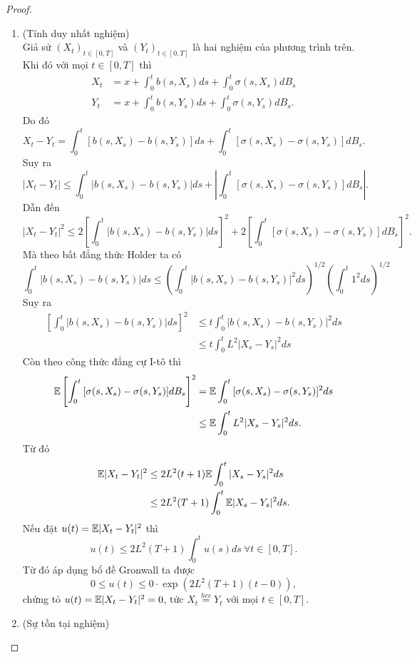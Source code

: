 \begin{proof}
\begin{enumerate}
    \item (Tính duy nhất nghiệm)\\
    Giả sử $(X_t)_{t \in [0,T]}$ và $(Y_t)_{t \in [0,T]}$ là hai nghiệm của phương trình trên. Khi đó với mọi $t \in [0,T]$ thì
    \begin{align*}
        X_t &= x + \int_0^t{b(s,X_s)ds} + \int_0^t{\sigma(s,X_s)dB_s}\\
        Y_t &= x + \int_0^t{b(s,Y_s)ds} + \int_0^t{\sigma(s,Y_s)dB_s}.
    \end{align*}
    Do đó 
    \[X_t-Y_t = \int_0^t{[b(s,X_s)-b(s,Y_s)]ds} + \int_0^t{[\sigma(s,X_s)-\sigma(s,Y_s)]dB_s}.\]
    Suy ra 
    \[|X_t-Y_t| \leq \int_0^t{\left|b(s,X_s)-b(s,Y_s)\right|ds} + \left|\int_0^t{[\sigma(s,X_s)-\sigma(s,Y_s)]dB_s}\right|.\]
    Dẫn đến 
    \[|X_t-Y_t|^2 \leq 2\left[\int_0^t{\left|b(s,X_s)-b(s,Y_s)\right|ds}\right]^2 + 2\left[\int_0^t{[\sigma(s,X_s)-\sigma(s,Y_s)]dB_s}\right]^2.\]
    Mà theo bất đẳng thức Holder ta có
    \[\int_0^t{\left|b(s,X_s)-b(s,Y_s)\right|ds} \leq \left(\int_0^t{\left|b(s,X_s)-b(s,Y_s)\right|^2ds}\right)^{1/2} \left(\int_0^t{1^2ds}\right)^{1/2}\]
    Suy ra 
    \begin{align*}
        \left[\int_0^t{\left|b(s,X_s)-b(s,Y_s)\right|ds}\right]^2 
        &\leq t\int_0^t{\left|b(s,X_s)-b(s,Y_s)\right|^2ds}\\
        &\leq t\int_0^t{L^2\left|X_s-Y_s\right|^2ds}
    \end{align*}
    Còn theo công thức đẳng cự I-tô thì
    \begin{align*}
        \mathbb{E}\left[\int_0^t{[\sigma(s,X_s)-\sigma(s,Y_s)]dB_s}\right]^2 
        &= \mathbb{E}\int_0^t{[\sigma(s,X_s)-\sigma(s,Y_s)]^2ds}\\
        & \leq \mathbb{E}\int_0^t{L^2|X_s-Y_s|^2ds}.
    \end{align*}
    Từ đó
    \begin{align*}
        \mathbb{E}|X_t-Y_t|^2 &\leq 2L^2(t+1)\mathbb{E}\int_0^t{|X_s-Y_s|^2ds}\\
        & \leq 2L^2(T+1)\int_0^t{\mathbb{E}|X_s-Y_s|^2ds}.
    \end{align*}
    Nếu đặt $u(t) = \mathbb{E}|X_t-Y_t|^2$ thì
    \[u(t) \leq 2L^2(T+1)\int_0^t{u(s)ds}~\forall t \in [0,T].\]
    Từ đó áp dụng bổ đề Gronwall ta được
    \[0 \leq u(t) \leq 0\cdot \exp\left(2L^2(T+1)(t-0)\right),\]
    chứng tỏ $u(t) =\mathbb{E}|X_t-Y_t|^2 = 0$, tức $X_t \overset{hcc}{=} Y_t$ với mọi $t \in [0,T]$.
    \item (Sự tồn tại nghiệm)

\end{enumerate}
\end{proof}
